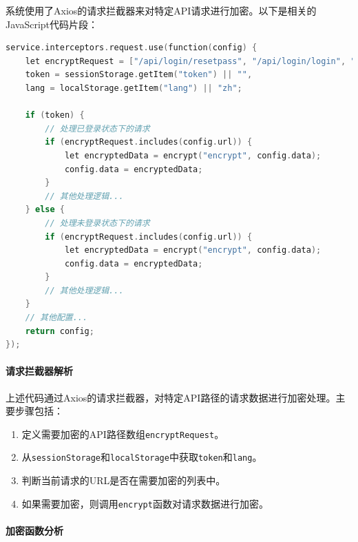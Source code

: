 \documentclass[14pt,a4paper,UTF8,twoside]{article}
\begin{document}
系统使用了Axios的请求拦截器来对特定API请求进行加密。以下是相关的JavaScript代码片段：

\begin{lstlisting}[language=C, caption=请求拦截与加密代码]
service.interceptors.request.use(function(config) {
    let encryptRequest = ["/api/login/resetpass", "/api/login/login", "/api/login/forget", "/api/Seat/confirm", "/api/Seminar/confirm", "/reserve/index/confirm", "/api/Enter/confirm", "/api/Seat/touch_qr_books", "/api/seat/qrcode", "/api/seat/qrcode_not_card", "/api/Study/StudyOrder", "/api/login/updateUserInfo", "/api/seat/xuzuoconfirm"],
    token = sessionStorage.getItem("token") || "",
    lang = localStorage.getItem("lang") || "zh";
    
    if (token) {
        // 处理已登录状态下的请求
        if (encryptRequest.includes(config.url)) {
            let encryptedData = encrypt("encrypt", config.data);
            config.data = encryptedData;
        }
        // 其他处理逻辑...
    } else {
        // 处理未登录状态下的请求
        if (encryptRequest.includes(config.url)) {
            let encryptedData = encrypt("encrypt", config.data);
            config.data = encryptedData;
        }
        // 其他处理逻辑...
    }
    // 其他配置...
    return config;
});
\end{lstlisting}

\paragraph{请求拦截器解析}

上述代码通过Axios的请求拦截器，对特定API路径的请求数据进行加密处理。主要步骤包括：

\begin{enumerate}
    \item 定义需要加密的API路径数组\texttt{encryptRequest}。
    \item 从\texttt{sessionStorage}和\texttt{localStorage}中获取\texttt{token}和\texttt{lang}。
    \item 判断当前请求的URL是否在需要加密的列表中。
    \item 如果需要加密，则调用\texttt{encrypt}函数对请求数据进行加密。
\end{enumerate}

\paragraph{加密函数分析}
\end{document}
